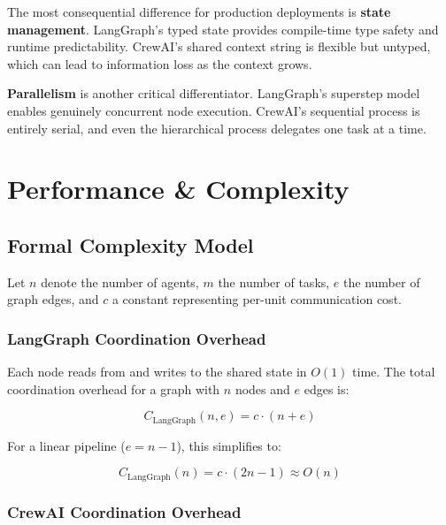 \documentclass[12pt,a4paper]{article}
\begin{document}
The most consequential difference for production deployments is
\textbf{state management}. LangGraph's typed state provides compile-time type
safety and runtime predictability. CrewAI's shared context string is flexible
but untyped, which can lead to information loss as the context grows.

\textbf{Parallelism} is another critical differentiator. LangGraph's superstep
model enables genuinely concurrent node execution. CrewAI's sequential process
is entirely serial, and even the hierarchical process delegates one task at a
time.

\section{Performance \& Complexity}
\label{sec:performance}

\subsection{Formal Complexity Model}

Let $n$ denote the number of agents, $m$ the number of tasks, $e$ the number
of graph edges, and $c$ a constant representing per-unit communication cost.

\subsubsection{LangGraph Coordination Overhead}

Each node reads from and writes to the shared state in $O(1)$ time. The total
coordination overhead for a graph with $n$ nodes and $e$ edges is:

\begin{equation}
    \label{eq:lg_full}
    C_{\text{LangGraph}}(n, e) = c \cdot (n + e)
\end{equation}

For a linear pipeline ($e = n - 1$), this simplifies to:

\begin{equation}
    \label{eq:lg_linear}
    C_{\text{LangGraph}}(n) = c \cdot (2n - 1) \approx O(n)
\end{equation}

\subsubsection{CrewAI Coordination Overhead}
\end{document}
